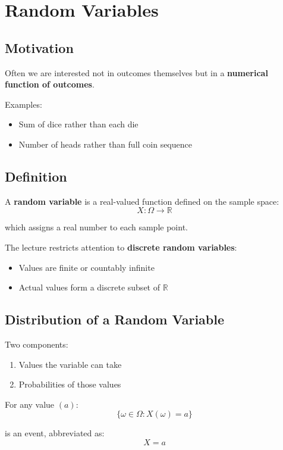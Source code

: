 \documentclass[12pt]{article}
\begin{document}
\section{Random Variables}

\subsection{Motivation}

Often we are interested not in outcomes themselves but in a \textbf{numerical function of outcomes}.

Examples:
\begin{itemize}
\item Sum of dice rather than each die
\item Number of heads rather than full coin sequence
\end{itemize}

\subsection{Definition}

A \textbf{random variable} is a real-valued function defined on the sample space:
\[
X: \Omega \rightarrow \mathbb{R}
\]

which assigns a real number to each sample point.

The lecture restricts attention to \textbf{discrete random variables}:

\begin{itemize}
\item Values are finite or countably infinite
\item Actual values form a discrete subset of $\mathbb{R}$
\end{itemize}

\subsection{Distribution of a Random Variable}

Two components:

\begin{enumerate}
\item Values the variable can take
\item Probabilities of those values
\end{enumerate}

For any value $(a)$:
\[
\{ \omega \in \Omega : X(\omega)=a \}
\]

is an event, abbreviated as:
\[
X = a
\]
\end{document}
